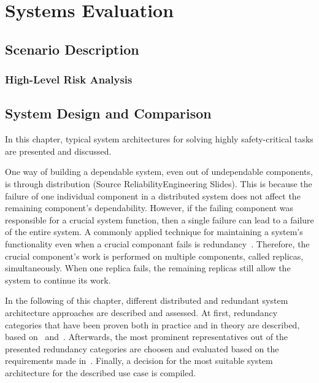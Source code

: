 \chapter{Systems Evaluation}
\label{chptr:evaluation}




\section{Scenario Description}

\subsection{High-Level Risk Analysis}

\section{System Design and Comparison}



\iffalse

In this chapter, typical system architectures for solving highly safety-critical tasks are presented and discussed.

One way of building a dependable system, even out of undependable components, is through distribution (Source ReliabilityEngineering Slides).
This is because the failure of one individual component in a distributed system does not affect the remaining component's dependability.
However, if the failing component was responsible for a crucial system function, then a single failure can lead to a failure of the entire system.
A commonly applied technique for maintaining a system's functionality even when a crucial componant fails is redundancy~\cite{TanenbaumSteen07}.
Therefore, the crucial component's work is performed on multiple components, called replicas, simultaneously.
When one replica fails, the remaining replicas still allow the system to continue its work.

In the following of this chapter, different distributed and redundant system architecture approaches are described and assessed.
At first, redundancy categories that have been proven both in practice and in theory are described, based on~\cite{GeffroyMotetDependableComputing} and~\cite{BarryFaultToleranceAnalysis}.
Afterwards, the most prominent representatives out of the presented redundancy categories are choosen and evaluated based on the requirements made in~.
Finally, a decision for the most suitable system architecture for the described use case is compiled.

